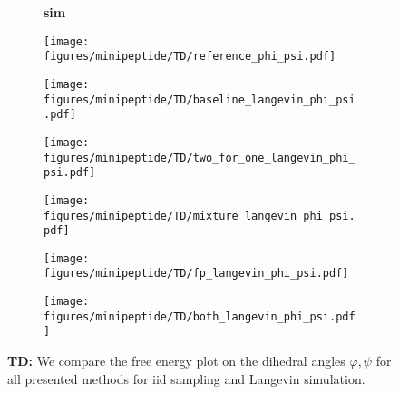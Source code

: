 \begin{figure}
    \begin{minipage}{\textwidth}
        \begin{subfigure}[c]{0.05\textwidth}
            \vspace{-0.2cm}
            \textbf{sim}
        \end{subfigure}
        \begin{subfigure}[c]{0.15\textwidth}
            \centering
            \texttt{[image: figures/minipeptide/TD/reference\_phi\_psi.pdf]}            
        \end{subfigure}
        \begin{subfigure}[c]{0.15\textwidth}
            \centering
            \texttt{[image: figures/minipeptide/TD/baseline\_langevin\_phi\_psi.pdf]}            
        \end{subfigure}
        \begin{subfigure}[c]{0.15\textwidth}
            \centering
            \texttt{[image: figures/minipeptide/TD/two\_for\_one\_langevin\_phi\_psi.pdf]}
        \end{subfigure}
        \begin{subfigure}[c]{0.15\textwidth}
            \centering
            \texttt{[image: figures/minipeptide/TD/mixture\_langevin\_phi\_psi.pdf]}
        \end{subfigure}
        \begin{subfigure}[c]{0.15\textwidth}
            \centering
            \texttt{[image: figures/minipeptide/TD/fp\_langevin\_phi\_psi.pdf]}            
        \end{subfigure}
        \begin{subfigure}[c]{0.15\textwidth}
            \centering
            \texttt{[image: figures/minipeptide/TD/both\_langevin\_phi\_psi.pdf]}            
        \end{subfigure}
    \end{minipage}
    \caption{\textbf{TD:} We compare the free energy plot on the dihedral angles $\varphi, \psi$ for all presented methods for iid sampling and Langevin simulation.}
    \label{fig:minipeptide-td}
\end{figure}

